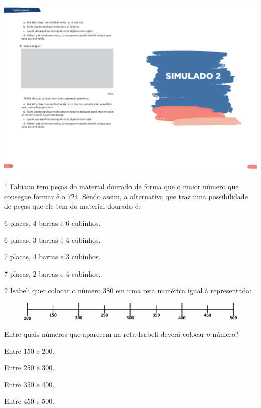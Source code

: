\vspace*{-3.4cm}
\hspace*{-3.7cm}\includegraphics[scale=1]{../watermarks/2simulado5ano.pdf}

\pagebreak
\num{1} Fabiano tem peças do material dourado de forma que o maior número
que consegue formar é o 724. Sendo assim, a alternativa que traz uma
possibilidade de peças que ele tem do material dourado é:

\begin{escolha}
\item
  6 placas, 4 barras e 6 cubinhos.
\item
  6 placas, 3 barras e 4 cubinhos.
\item
  7 placas, 4 barras e 3 cubinhos.
\item
  7 placas, 2 barras e 4 cubinhos.
\end{escolha}

\num{2} Isabeli quer colocar o número 380 em uma reta numérica igual à representada:

\begin{figure}[htpb!]
\centering
\includegraphics[width=\textwidth]{./media/image102.png}
\end{figure}

Entre quais números que aparecem na reta Isabeli deverá colocar o número?

\begin{multicols}{2}
\begin{escolha}
\item
  Entre 150 e 200.
\item
  Entre 250 e 300.
\item
  Entre 350 e 400.
\item
  Entre 450 e 500.
\end{escolha}
\end{multicols}


